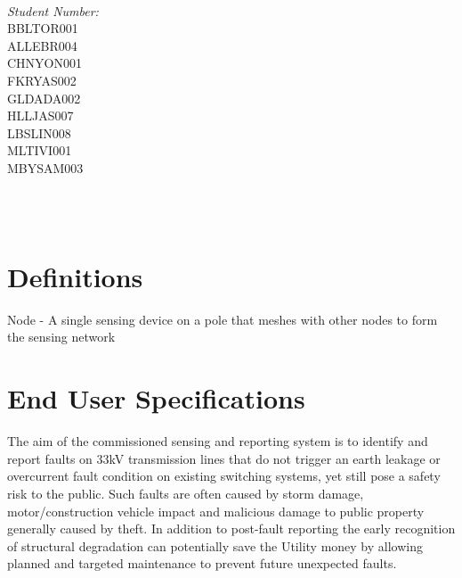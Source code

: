 \documentclass[12pt]{article}
\makeatletter
\let\thedate\@date
\makeatother
\begin{document}
\begin{titlepage}
\begin{minipage}{0.4\textwidth}
\begin{flushleft}
			\end{flushleft}
			\end{minipage}~
			\begin{minipage}{0.4\textwidth}
			\begin{flushright} \large
			\emph{Student Number:} \\
      BBLTOR001\\
      ALLEBR004\\
      CHNYON001\\
      FKRYAS002\\
      GLDADA002\\
      HLLJAS007\\
      LBSLIN008\\
      MLTIVI001\\
      MBYSAM003\\									%
		\end{flushright}
	\end{minipage}\\[0.5 cm]
	
	{\large \thedate}\\[0.5 cm]
 
	\vfill
	
\end{titlepage}


\tableofcontents
\pagebreak


\section{Definitions}

Node - A single sensing device on a pole that meshes with other nodes to form the sensing network

\section{End User Specifications}

The aim of the commissioned sensing and reporting system is to identify and report faults on 33kV transmission lines 
that do not trigger an earth leakage or overcurrent fault condition on existing switching systems, yet still pose 
a safety risk to the public. Such faults are often caused by storm damage, motor/construction vehicle impact and 
malicious damage to public property generally caused by theft. In addition to post-fault reporting the early recognition
of structural degradation can potentially save the Utility money by allowing planned and targeted maintenance to prevent 
future unexpected faults.
\end{document}

